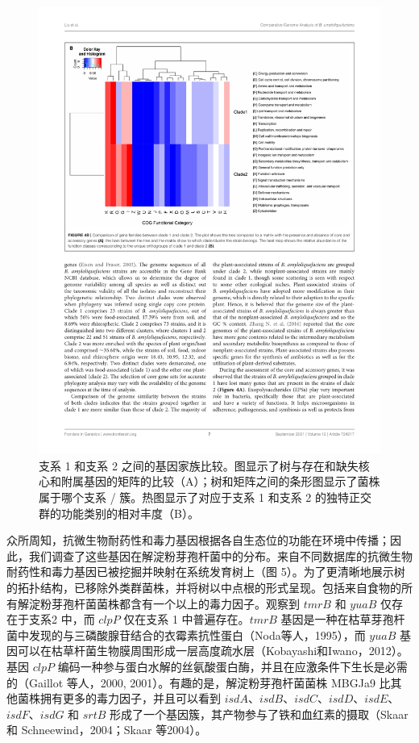 \documentclass[UTF8]{ctexart}
\begin{document}
\begin{figure}[!htb]
    \addtocounter {figure}{-1}
    \centering
    \includegraphics[width=\textwidth]{figures/figure4B.pdf}
    \caption{支系 1 和支系 2 之间的基因家族比较。图显示了树与存在和缺失核心和附属基因的矩阵的比较（A）；树和矩阵之间的条形图显示了菌株属于哪个支系 / 簇。热图显示了对应于支系 1 和支系 2 的独特正交群的功能类别的相对丰度（B）。}
\end{figure}

众所周知，抗微生物耐药性和毒力基因根据各自生态位的功能在环境中传播；因此，我们调查了这些基因在解淀粉芽孢杆菌中的分布。来自不同数据库的抗微生物耐药性和毒力基因已被挖掘并映射在系统发育树上（图 5）。为了更清晰地展示树的拓扑结构，已移除外类群菌株，并将树以中点根的形式呈现。包括来自食物的所有解淀粉芽孢杆菌菌株都含有一个以上的毒力因子。观察到 $tmrB$ 和 $yuaB$ 仅存在于支系2 中，而 $clpP$ 仅在支系 1 中普遍存在。$tmrB$ 基因是一种在枯草芽孢杆菌中发现的与三磷酸腺苷结合的衣霉素抗性蛋白（Noda等人，1995），而 $yuaB$ 基因可以在枯草杆菌生物膜周围形成一层高度疏水层（Kobayashi和Iwano，2012）。基因 $clpP$ 编码一种参与蛋白水解的丝氨酸蛋白酶，并且在应激条件下生长是必需的（Gaillot 等人，2000, 2001）。有趣的是，解淀粉芽孢杆菌菌株 MBGJa9 比其他菌株拥有更多的毒力因子，并且可以看到 $isdA$、$isdB$、$isdC$、$isdD$、$isdE$、$isdF$、$isdG$ 和 $srtB$ 形成了一个基因簇，其产物参与了铁和血红素的摄取（Skaar 和 Schneewind，2004；Skaar 等2004）。
\end{document}
